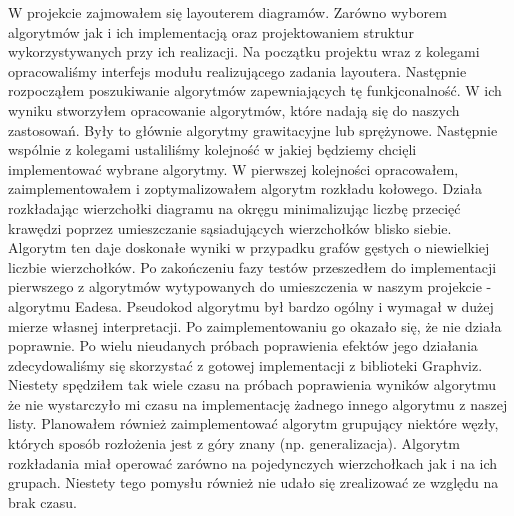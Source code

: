 W projekcie zajmowałem się layouterem diagramów. Zarówno wyborem algorytmów jak i ich implementacją oraz projektowaniem struktur wykorzystywanych przy ich realizacji.
Na początku projektu wraz z kolegami opracowaliśmy interfejs modułu realizującego zadania layoutera. Następnie rozpocząłem poszukiwanie algorytmów zapewniających tę funkjconalność. W ich wyniku stworzyłem opracowanie algorytmów, które nadają się do naszych zastosowań. Były to głównie algorytmy grawitacyjne lub sprężynowe. Następnie wspólnie z kolegami ustaliliśmy kolejność w jakiej będziemy chcięli implementować wybrane algorytmy.
W pierwszej kolejności opracowałem, zaimplementowałem i zoptymalizowałem algorytm rozkładu kołowego. Działa rozkładając wierzchołki diagramu na okręgu minimalizując liczbę przecięć krawędzi poprzez umieszczanie sąsiadujących wierzchołków blisko siebie. Algorytm ten daje doskonałe wyniki w przypadku grafów gęstych o niewielkiej liczbie wierzchołków.
Po zakończeniu fazy testów przeszedłem do implementacji pierwszego z algorytmów wytypowanych do umieszczenia w naszym projekcie - algorytmu Eadesa. Pseudokod algorytmu był bardzo ogólny i wymagał w dużej mierze własnej interpretacji. Po zaimplementowaniu go okazało się, że nie działa poprawnie. Po wielu nieudanych próbach poprawienia efektów jego działania zdecydowaliśmy się skorzystać z gotowej implementacji z biblioteki Graphviz.
Niestety spędziłem tak wiele czasu na próbach poprawienia wyników algorytmu że nie wystarczyło mi czasu na implementację żadnego innego algorytmu z naszej listy.
Planowałem również zaimplementować algorytm grupujący niektóre węzły, których sposób rozłożenia jest z góry znany (np. generalizacja). Algorytm rozkładania miał operować zarówno na pojedynczych wierzchołkach jak i na ich grupach. Niestety tego pomysłu również nie udało się zrealizować ze względu na brak czasu.
